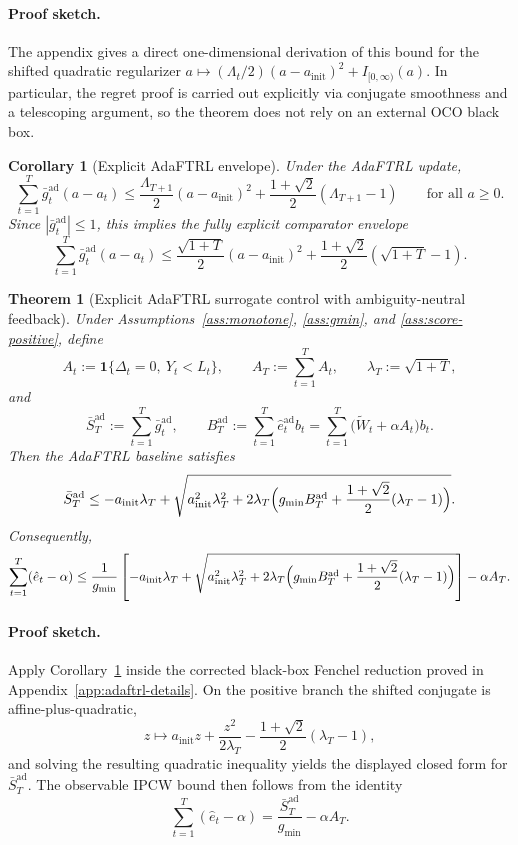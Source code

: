 \documentclass[11pt]{article}
\newtheorem{theorem}{Theorem}
\newtheorem{corollary}{Corollary}
\newcommand{\1}{\mathbf{1}}
\begin{document}
\paragraph{Proof sketch.}
The appendix gives a direct one-dimensional derivation of this bound for the shifted quadratic regularizer \(a\mapsto (\Lambda_t/2)(a-a_{\mathrm{init}})^2+I_{[0,\infty)}(a)\). In particular, the regret proof is carried out explicitly via conjugate smoothness and a telescoping argument, so the theorem does not rely on an external OCO black box.

\begin{corollary}[Explicit AdaFTRL envelope]
\label{cor:adaftrl-envelope-main}
Under the AdaFTRL update,
\[
\sum_{t=1}^T \bar g_t^{\mathrm{ad}}(a-a_t)
\le
\frac{\Lambda_{T+1}}{2}(a-a_{\mathrm{init}})^2+
\frac{1+\sqrt{2}}{2}(\Lambda_{T+1}-1)
\qquad\text{for all }a\ge 0.
\]
Since \( |\bar g_t^{\mathrm{ad}}|\le 1 \), this implies the fully explicit comparator envelope
\[
\sum_{t=1}^T \bar g_t^{\mathrm{ad}}(a-a_t)
\le
\frac{\sqrt{1+T}}{2}(a-a_{\mathrm{init}})^2+
\frac{1+\sqrt{2}}{2}(\sqrt{1+T}-1).
\]
\end{corollary}

\begin{theorem}[Explicit AdaFTRL surrogate control with ambiguity-neutral feedback]
\label{thm:adaftrl-surrogate-main}
Under Assumptions~\ref{ass:monotone}, \ref{ass:gmin}, and \ref{ass:score-positive}, define
\[
A_t:=\1\{\Delta_t=0,\ Y_t<L_t\},
\qquad
A_T:=\sum_{t=1}^T A_t,
\qquad
\lambda_T:=\sqrt{1+T},
\]
and
\[
\bar S_T^{\mathrm{ad}}:=\sum_{t=1}^T\bar g_t^{\mathrm{ad}},
\qquad
B_T^{\mathrm{ad}}:=\sum_{t=1}^T \hat e_t^{\mathrm{ad}} b_t
=\sum_{t=1}^T \bigl(\widetilde W_t+\alpha A_t\bigr)b_t.
\]
Then the AdaFTRL baseline satisfies
\[
\bar S_T^{\mathrm{ad}}
\le
-a_{\mathrm{init}}\lambda_T
+
\sqrt{
a_{\mathrm{init}}^2\lambda_T^2
+
2\lambda_T\Bigl(g_{\min}B_T^{\mathrm{ad}}+\frac{1+\sqrt{2}}{2}(\lambda_T-1)\Bigr)
}.
\]
Consequently,
\[
\sum_{t=1}^T(\hat e_t-\alpha)
\le
\frac{1}{g_{\min}}
\left[
-a_{\mathrm{init}}\lambda_T
+
\sqrt{
a_{\mathrm{init}}^2\lambda_T^2
+
2\lambda_T\Bigl(g_{\min}B_T^{\mathrm{ad}}+\frac{1+\sqrt{2}}{2}(\lambda_T-1)\Bigr)
}
\right]
-
\alpha A_T.
\]
\end{theorem}

\paragraph{Proof sketch.}
Apply Corollary~\ref{cor:adaftrl-envelope-main} inside the corrected black-box Fenchel reduction proved in Appendix~\ref{app:adaftrl-details}. On the positive branch the shifted conjugate is affine-plus-quadratic,
\[
z\mapsto a_{\mathrm{init}}z+\frac{z^2}{2\lambda_T}-\frac{1+\sqrt{2}}{2}(\lambda_T-1),
\]
and solving the resulting quadratic inequality yields the displayed closed form for \(\bar S_T^{\mathrm{ad}}\). The observable IPCW bound then follows from the identity
\[
\sum_{t=1}^T(\hat e_t-\alpha)=\frac{\bar S_T^{\mathrm{ad}}}{g_{\min}}-\alpha A_T.
\]
\end{document}
